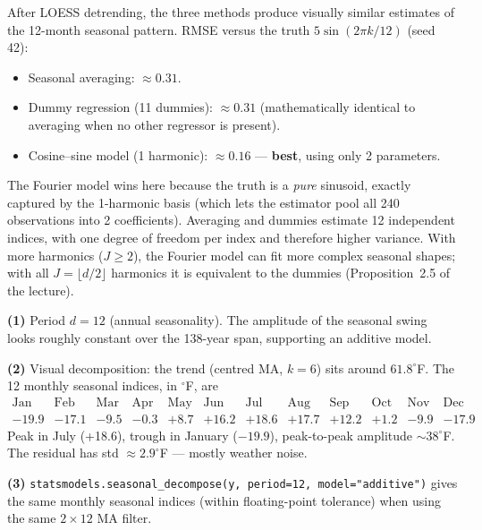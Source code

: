 \documentclass[a4paper,11pt]{article}
\begin{document}
\begin{solution}
After LOESS detrending, the three methods produce visually similar
estimates of the 12-month seasonal pattern. RMSE versus the truth
$5 \sin(2\pi k / 12)$ (seed 42):
\begin{itemize}
  \item Seasonal averaging: $\approx 0.31$.
  \item Dummy regression (11 dummies): $\approx 0.31$ (mathematically
        identical to averaging when no other regressor is present).
  \item Cosine--sine model (1 harmonic): $\approx 0.16$ — \textbf{best},
        using only 2 parameters.
\end{itemize}
The Fourier model wins here because the truth is a \emph{pure}
sinusoid, exactly captured by the 1-harmonic basis (which lets the
estimator pool all 240 observations into 2 coefficients). Averaging
and dummies estimate 12 independent indices, with one degree of
freedom per index and therefore higher variance. With more harmonics
($J \geq 2$), the Fourier model can fit more complex seasonal shapes;
with all $J = \lfloor d/2 \rfloor$ harmonics it is equivalent to the
dummies (Proposition~2.5 of the lecture).
\end{solution}

\begin{exercise}\end{exercise}

\begin{solution}
\textbf{(1)} Period $d = 12$ (annual seasonality). The amplitude of
the seasonal swing looks roughly constant over the 138-year span,
supporting an additive model.

\textbf{(2)} Visual decomposition: the trend (centred MA, $k = 6$)
sits around $61.8^\circ$F. The 12 monthly seasonal indices, in
$^\circ$F, are
\[
\begin{array}{rrrrrrrrrrrr}
\text{Jan} & \text{Feb} & \text{Mar} & \text{Apr} & \text{May} & \text{Jun}
& \text{Jul} & \text{Aug} & \text{Sep} & \text{Oct} & \text{Nov} & \text{Dec}\\
-19.9 & -17.1 & -9.5 & -0.3 & +8.7 & +16.2 & +18.6 & +17.7 & +12.2 & +1.2 & -9.9 & -17.9
\end{array}
\]
Peak in July (+18.6), trough in January ($-19.9$), peak-to-peak
amplitude $\sim 38^\circ$F. The residual has std $\approx 2.9^\circ$F
— mostly weather noise.

\textbf{(3)} \texttt{statsmodels.seasonal\_decompose(y, period=12,
model="additive")} gives the same monthly seasonal indices (within
floating-point tolerance) when using the same $2 \times 12$ MA filter.
\end{solution}
\end{document}
